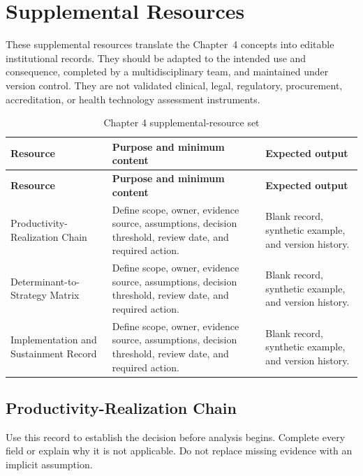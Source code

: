 \section{Supplemental Resources}
\label{sec:comp-ch04-supplemental}

These supplemental resources translate the Chapter~4 concepts into editable
institutional records. They should be adapted to the intended use and consequence,
completed by a multidisciplinary team, and maintained under version control. They
are not validated clinical, legal, regulatory, procurement, accreditation, or health
technology assessment instruments.

\begin{longtable}{@{}p{}p{}p{}@{}}
\caption{Chapter 4 supplemental-resource set}
\label{tab:comp-ch04-supplemental-set}\\
\toprule
\textbf{Resource} & \textbf{Purpose and minimum content} & \textbf{Expected output} \\
\midrule
\endfirsthead
\toprule
\textbf{Resource} & \textbf{Purpose and minimum content} & \textbf{Expected output} \\
\midrule
\endhead
\bottomrule
\endlastfoot
Productivity-Realization Chain & Define scope, owner, evidence source, assumptions, decision threshold, review date, and required action. & Blank record, synthetic example, and version history. \\
Determinant-to-Strategy Matrix & Define scope, owner, evidence source, assumptions, decision threshold, review date, and required action. & Blank record, synthetic example, and version history. \\
Implementation and Sustainment Record & Define scope, owner, evidence source, assumptions, decision threshold, review date, and required action. & Blank record, synthetic example, and version history. \\
\end{longtable}

\subsection{Productivity-Realization Chain}
\label{sec:comp-ch04-supp-1}
Use this record to establish the decision before analysis begins. Complete every
field or explain why it is not applicable. Do not replace missing evidence with an
implicit assumption.

